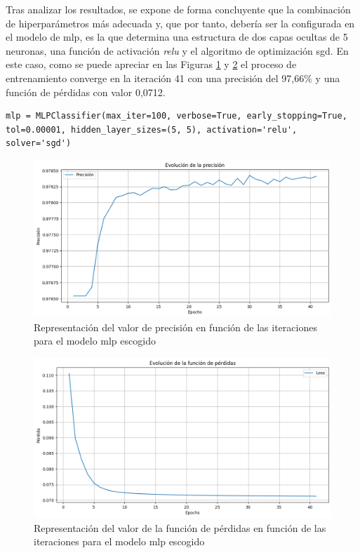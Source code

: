 \vspace{3mm}

Tras analizar los resultados, se expone de forma concluyente que la combinación de hiperparámetros más adecuada y, que por tanto, debería ser la configurada en el modelo de \gls{mlp}, es la que determina una estructura de dos capas ocultas de 5 neuronas, una función de activación \textit{relu} y el algoritmo de optimización \gls{sgd}. En este caso, como se puede apreciar en las Figuras \ref{fig:1mlpbestacc} y \ref{fig:1mlpbestloss} el proceso de entrenamiento converge en la iteración 41 con una precisión del 97,66\% y una función de pérdidas con valor 0,0712.

\vspace{3mm}

\begin{lstlisting}[style=Python, caption={Clasificador MLP óptimo}]
  mlp = MLPClassifier(max_iter=100, verbose=True, early_stopping=True, tol=0.00001, hidden_layer_sizes=(5, 5), activation='relu', solver='sgd')
\end{lstlisting}

\vspace{3mm}

\begin{figure}[H]
  \centering
  \includegraphics[width=1\textwidth]{img/desarrollo/ann/1mlpbestacc.png}
  \caption{Representación del valor de precisión en función de las iteraciones para el modelo \acrshort{mlp} escogido}
  \label{fig:1mlpbestacc}
\end{figure}

\begin{figure}[H]
  \centering
  \includegraphics[width=1\textwidth]{img/desarrollo/ann/1mlpbestloss.png}
  \caption{Representación del valor de la función de pérdidas en función de las iteraciones para el modelo \acrshort{mlp} escogido}
  \label{fig:1mlpbestloss}
\end{figure}

